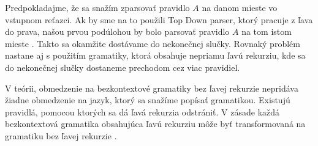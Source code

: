 Predpokladajme, že sa snažím zparsovať pravidlo $A$ na danom mieste vo vstupnom reťazci. Ak by sme na to použili Top Down parser, ktorý pracuje z ľava do prava, našou prvou podúlohou by bolo parsovať pravidlo $A$ na tom istom mieste \cite{moore2000removing}. Takto sa okamžite dostávame do nekonečnej slučky. Rovnaký problém nastane aj s použitím gramatiky, ktorá obsahuje nepriamu ľavú rekurziu, kde sa do nekonečnej slučky dostaneme prechodom cez viac pravidiel.

V teórii, obmedzenie na bezkontextové gramatiky bez ľavej rekurzie nepridáva žiadne obmedzenie na jazyk, ktorý sa snažíme popísať gramatikou. Existujú pravidlá, pomocou ktorých sa dá ľavá rekurzia odstrániť. V zásade každá bezkontextová gramatika obsahujúca ľavú rekurziu môže byť transformovaná na gramatiku bez ľavej rekurzie \cite{moore2000removing}.

